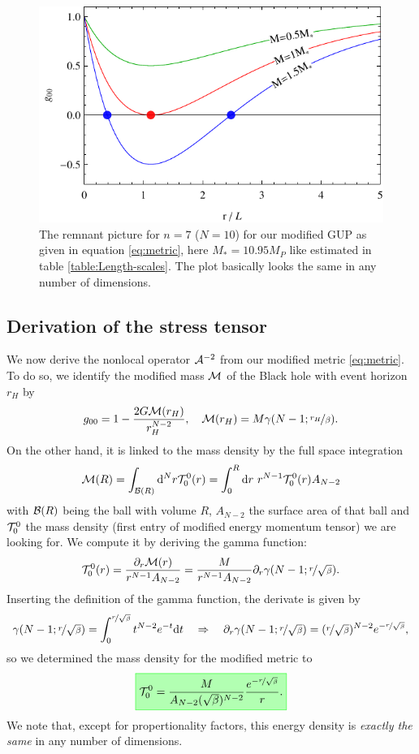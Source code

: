 \documentclass[10pt,a4paper]{article}
\newcommand{\highlight}[1]{%
   \fcolorbox{green}{green!30}{$\displaystyle#1$}%
}
\begin{document}
\begin{figure}
\includegraphics[scale=1]{figures/g00_n7.pdf}
\caption{The remnant picture for $n=7$ ($N=10$) for our modified GUP as given in equation \eqref{eq:metric}, here $M_*=10.95 M_P$ like estimated in table \ref{table:Length-scales}. The plot basically looks the same in any number of dimensions.}\label{fig:g00}
\end{figure}

\clearpage
\subsection{Derivation of the stress tensor}
We now derive the nonlocal operator ${\cal A}^{-2}$ from our modified metric \eqref{eq:metric}. To do so, we identify the modified mass ${\cal M}$ of the Black hole with event horizon $r_H$ by
\begin{equation}
g_{00} = 1 - \frac{2G {\cal M}(r_H)}{r_H^{N-2}}, \quad
{\cal M}(r_H) = M \gamma(N-1; \nicefrac{r_H}\beta).
\end{equation}
On the other hand, it is linked to the mass density by the full space integration
\begin{equation}
{\cal M}(R) = \int_{{\cal B}(R)} \mathrm{d}^N r {\cal T}^0_0(r) =
\int_0^R \mathrm{d} r~r^{N-1} {\cal T}^0_0(r) A_{N-2}
\end{equation}
with ${\cal B}(R)$ being the ball with volume $R$, $A_{N-2}$ the surface area of that ball and ${\cal T}^0_0$ the mass density (first entry of modified energy momentum tensor) we are looking for. We compute it by deriving the gamma function:
\begin{equation}
{\cal T}^0_0(r) = \frac{\partial_r {\cal M}(r)}{r^{N-1} A_{N-2}} = \frac{M}{r^{N-1} A_{N-2}} \partial_r \gamma(N-1; \nicefrac{r}{\sqrt{\beta}}).
\end{equation}
Inserting the definition of the gamma function, the derivate is given by
\begin{equation}
\gamma(N-1; \nicefrac{r}{\sqrt{\beta}}) = \int_0^{\nicefrac{r}{\sqrt{\beta}}} t^{N-2} e^{-t} \mathrm{d} t
\quad\Rightarrow\quad
 \partial_r \gamma(N-1; \nicefrac{r}{\sqrt{\beta}}) = (\nicefrac{r}{\sqrt{\beta}})^{N-2} e^{-\nicefrac{r}{\sqrt{\beta}}},
\end{equation}
so we determined the mass density for the modified metric to
\begin{equation}
\highlight{
\C T^0_0 = \frac{M}{A_{N-2} (\sqrt{\beta})^{N-2}} \frac{e^{-\rbb}}{r}.
}%
\end{equation}
We note that, except for propertionality factors, this energy density is \emph{exactly the same} in any number of dimensions.
\end{document}
